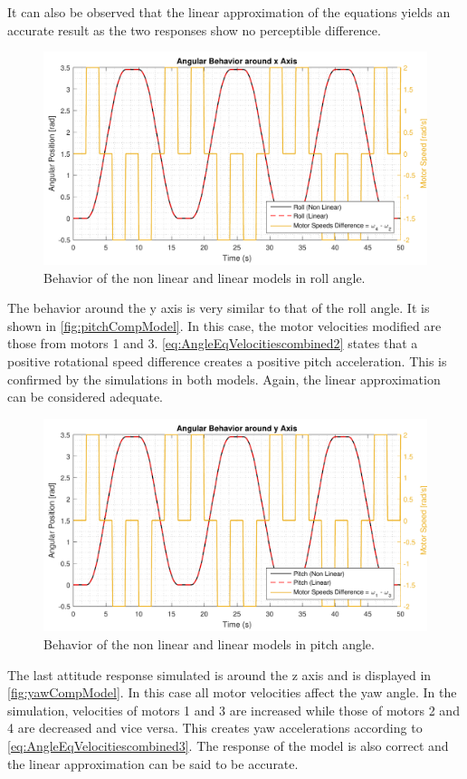 It can also be observed that the linear approximation of the equations yields an accurate result as the two responses show no perceptible difference. 
%
\begin{figure}[H]
	\centering
	\includegraphics[scale=0.65]{figures/rollCompModel}
	\caption{Behavior of the non linear and linear models in roll angle.}
	\label{fig:rollCompModel}
\end{figure}
%
The behavior around the y axis is very similar to that of the roll angle. It is shown in \autoref{fig:pitchCompModel}. In this case, the motor velocities modified are those from motors 1 and 3. 
%
\autoref{eq:AngleEqVelocitiescombined2} states that a positive rotational speed difference creates a positive pitch acceleration. This is confirmed by the simulations in both models. Again, the linear approximation can be considered adequate.
\begin{figure}[H]
	\centering
	\includegraphics[scale=0.65]{figures/pitchCompModel}
	\caption{Behavior of the non linear and linear models in pitch angle.}
	\label{fig:pitchCompModel}
\end{figure}
%
The last attitude response simulated is around the z axis and is displayed in \autoref{fig:yawCompModel}. In this case all motor velocities affect the yaw angle. In the simulation, velocities of motors 1 and 3 are increased while those of motors 2 and 4 are decreased and vice versa. This creates yaw accelerations according to \autoref{eq:AngleEqVelocitiescombined3}. The response of the model is also correct and the linear approximation can be said to be accurate. 
